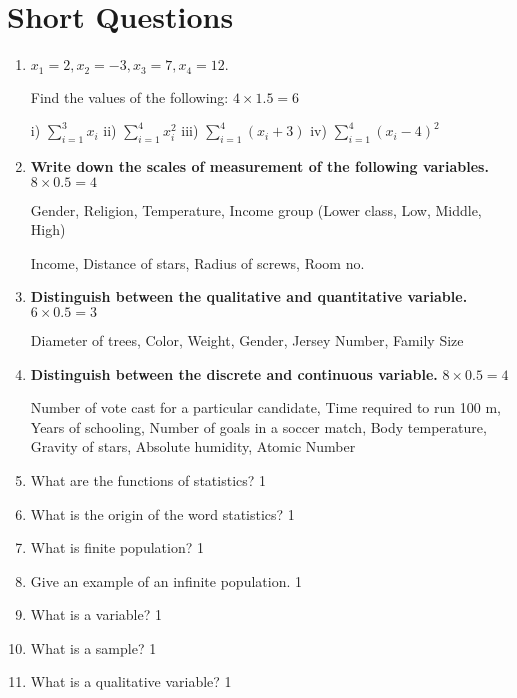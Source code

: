 \documentclass[a4paper,oneside]{book}
\begin{document}
\section{Short Questions}
\begin{enumerate}
    \item
	$x_1=2, x_2=-3, x_3=7, x_4=12.$ 
	
	Find the values of the following: \hfill $4 \times 1.5 = 6$
	
	i) $\displaystyle \sum_{i=1}^3 x_i$ 
	ii) $\displaystyle \sum_{i=1}^4 x_i^2$
	iii) $\displaystyle \sum_{i=1}^4 (x_i+3)$
	iv) $\displaystyle \sum_{i=1}^4 (x_i-4)^2$
	
	
	\item \textbf{Write down the scales of measurement of the following variables.} \hfill $8 \times 0.5 = 4$

	Gender, Religion, Temperature, Income group (Lower class, Low, Middle, High)
	
Income, Distance of stars, Radius of screws, Room no.

\item \textbf{Distinguish between the qualitative and quantitative variable.} \hfill $6 \times 0.5 = 3$

Diameter of trees, Color, Weight, Gender, Jersey Number, Family Size

\item \textbf{Distinguish between the discrete and continuous variable.} \hfill $8 \times 0.5 = 4$

Number of vote cast for a particular candidate, Time required to run 100 m, Years of schooling, Number of goals in a soccer match, Body temperature, Gravity of stars, Absolute humidity, Atomic Number

\item What are the functions of statistics? \hfill 1

\item What is the origin of the word statistics? \hfill 1

\item What is finite population? \hfill 1

\item Give an example of an infinite population. \hfill 1

\item What is a variable? \hfill 1

\item What is a sample? \hfill 1

\item What is a qualitative variable? \hfill 1


\end{enumerate}
\end{document}
